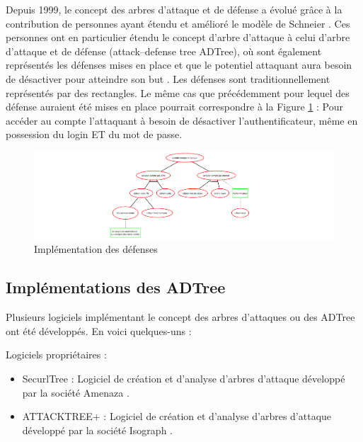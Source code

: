 		Depuis 1999, le concept des arbres d'attaque et de défense a évolué grâce à la contribution de personnes ayant étendu et amélioré le modèle de Schneier \cite{ADTreeKordy}. Ces personnes ont en particulier étendu le concept d'arbre d'attaque à celui d’arbre d’attaque et de défense (attack–defense tree ADTree), où sont également représentés les défenses mises en place et que le potentiel attaquant aura besoin de désactiver pour atteindre son but \cite{ADTreeOxford}. Les défenses sont traditionnellement représentés par des rectangles. Le même cas que précédemment pour lequel des défense auraient été mises en place pourrait correspondre à la Figure \ref{fig:arbre_exemple_3} : Pour accéder au compte l'attaquant à besoin de désactiver l'authentificateur, même en possession du login ET du mot de passe.

        \begin{figure}[htbp]
	        \centering
	        \includegraphics[width=\textwidth]{figure/exemple2_rapport.pdf}%
	        \caption{Implémentation des défenses}
	        \label{fig:arbre_exemple_3}
        \end{figure}

	\subsection{Implémentations des ADTree}
		Plusieurs logiciels implémentant le concept des arbres d'attaques ou des ADTree ont été développés. En voici quelques-uns :
        
        Logiciels propriétaires :
        \begin{itemize}
	        \item SecurlTree : Logiciel de création et d'analyse d'arbres d'attaque développé par la société Amenaza \cite{SecurlTree}.
	        \item ATTACKTREE+ : Logiciel de création et d'analyse d'arbres d'attaque développé par la société Isograph \cite{ATTACKTREE+}.
        \end{itemize}
        
